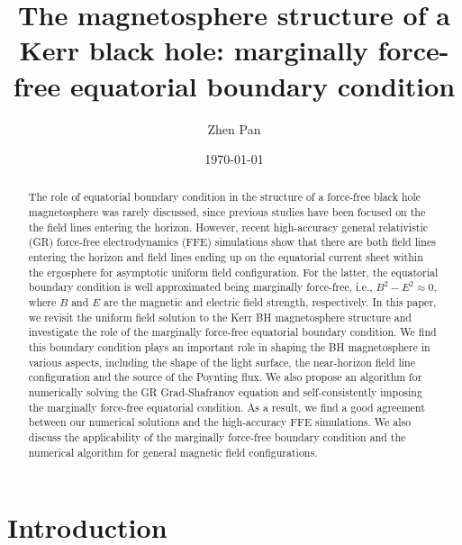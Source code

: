 \documentclass[aps,prd,reprint,nofootinbib, superscriptaddress]{revtex4-1}
\begin{document}
\title{The magnetosphere structure of a Kerr black hole:
marginally force-free equatorial boundary condition}
\author{Zhen Pan}

\date{\today}

\begin{abstract}
    The role of equatorial boundary condition in the structure of
    a force-free black hole magnetosphere was rarely discussed, since previous studies have been focused on the
    the field lines entering the horizon. However,
    recent high-accuracy general relativistic (GR) force-free electrodynamics (FFE) simulations \cite{East2018}
    show that there are both field lines entering the horizon and field lines ending up on
    the equatorial current sheet
    within the ergosphere for asymptotic uniform field configuration. For the latter, the equatorial boundary
    condition is well approximated being marginally force-free, i.e., $B^2-E^2\approx 0$, where $B$ and
    $E$ are the magnetic and electric field strength, respectively. In this paper, we revisit the uniform field
    solution to the Kerr BH magnetosphere structure and investigate the role of the marginally force-free
    equatorial boundary condition.  We find this boundary condition plays an important role in
    shaping the BH magnetosphere in various aspects, including the shape of the light surface, the near-horizon field
    line configuration and the source of the Poynting flux.
    We also propose an algorithm for numerically solving the GR Grad-Shafranov equation and self-consistently imposing the marginally force-free equatorial
    condition. As a result, we find a good agreement between our numerical solutions and the high-accuracy FFE simulations.
    We also discuss the applicability of the marginally force-free boundary condition and the numerical algorithm for general magnetic field configurations.
\end{abstract}


\maketitle

\section{Introduction}
\end{document}
